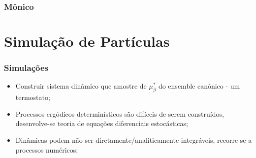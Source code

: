 \begin{frame}
	\frametitle{Mônico}

	
	
\end{frame}


\section{Simulação de Partículas}

\begin{frame}
	\frametitle{Simulações}
	
	\begin{itemize}
		\item Construir sistema dinâmico que amostre de $\mu^*_{\beta}$ do ensemble canônico - um termostato;
		\pause
		\item Processos ergódicos determinísticos são difíceis de serem construídos, desenvolve-se teoria de equações diferenciais estocásticas;
		\pause
		\item Dinâmicas podem não ser diretamente/analiticamente integráveis, recorre-se a processos numéricos;
	\end{itemize}
\end{frame}

